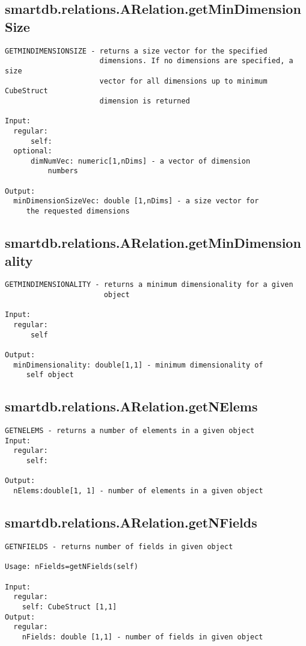 \subsection{\texorpdfstring{smartdb.relations.ARelation.getMinDimensionSize}{getMinDimensionSize}}\label{method:smartdb.relations.ARelation.getMinDimensionSize}
\begin{verbatim}
GETMINDIMENSIONSIZE - returns a size vector for the specified
                      dimensions. If no dimensions are specified, a size
                      vector for all dimensions up to minimum CubeStruct
                      dimension is returned

Input:
  regular:
      self:
  optional:
      dimNumVec: numeric[1,nDims] - a vector of dimension
          numbers

Output:
  minDimensionSizeVec: double [1,nDims] - a size vector for
     the requested dimensions
\end{verbatim}
\subsection{\texorpdfstring{smartdb.relations.ARelation.getMinDimensionality}{getMinDimensionality}}\label{method:smartdb.relations.ARelation.getMinDimensionality}
\begin{verbatim}
GETMINDIMENSIONALITY - returns a minimum dimensionality for a given
                       object

Input:
  regular:
      self

Output:
  minDimensionality: double[1,1] - minimum dimensionality of
     self object
\end{verbatim}
\subsection{\texorpdfstring{smartdb.relations.ARelation.getNElems}{getNElems}}\label{method:smartdb.relations.ARelation.getNElems}
\begin{verbatim}
GETNELEMS - returns a number of elements in a given object
Input:
  regular:
     self:

Output:
  nElems:double[1, 1] - number of elements in a given object
\end{verbatim}
\subsection{\texorpdfstring{smartdb.relations.ARelation.getNFields}{getNFields}}\label{method:smartdb.relations.ARelation.getNFields}
\begin{verbatim}
GETNFIELDS - returns number of fields in given object

Usage: nFields=getNFields(self)

Input:
  regular:
    self: CubeStruct [1,1]
Output:
  regular:
    nFields: double [1,1] - number of fields in given object
\end{verbatim}
